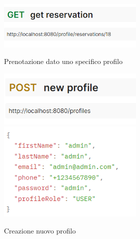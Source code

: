 \begin{figure}[h!]
\includegraphics[width=7cm]{test/postman/getreservation.PNG}\\
\caption{Prenotazione dato uno specifico profilo}
\end{figure}

\begin{figure}[h!]
\includegraphics[width=7cm]{test/postman/tnewprofile.PNG}\\
\includegraphics[width=7cm]{test/postman/newprofile.PNG}\\
\caption{Creazione nuovo profilo}
\end{figure}
